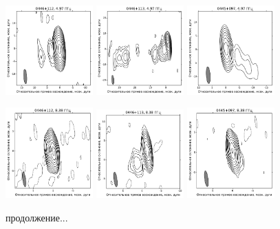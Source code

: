 \begin{figure}
  \includegraphics[width=0.3\textwidth]{0446+112_C.pdf}
  \includegraphics[width=0.3\textwidth]{0446+113_C.pdf}
  \includegraphics[width=0.3\textwidth]{0445+097_C.pdf}


  \includegraphics[width=0.3\textwidth]{0446+112_X.pdf}
  \includegraphics[width=0.3\textwidth]{0446+113_X.pdf}
  \includegraphics[width=0.3\textwidth]{0445+097_X.pdf}

  \caption{продолжение...}
\end{figure}

